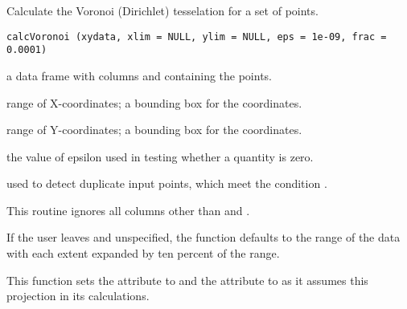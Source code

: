 \documentclass[letterpaper]{book}
\begin{document}
%
\begin{Examples}
\end{Examples}
%
\begin{Description}\relax
Calculate the Voronoi (Dirichlet) tesselation for a set of points.
\end{Description}
%
\begin{Usage}
\begin{verbatim}
calcVoronoi (xydata, xlim = NULL, ylim = NULL, eps = 1e-09, frac = 0.0001)
\end{verbatim}
\end{Usage}
%
\begin{Arguments}
\begin{ldescription}
\item[\code{xydata}] a data frame with columns  and 
containing the points.
\item[\code{xlim}] range of X-coordinates; a bounding box for the
coordinates.
\item[\code{ylim}] range of Y-coordinates; a bounding box for the
coordinates.
\item[\code{eps}] the value of epsilon used in testing whether a quantity is
zero.
\item[\code{frac}] used to detect duplicate input points, which meet the
condition .
\end{ldescription}
\end{Arguments}
%
\begin{Details}\relax
This routine ignores all columns other than  and .

If the user leaves  and  unspecified, the
function defaults to the range of the data with each extent expanded
by ten percent of the range.

This function sets the attribute  to  and the
attribute  to  as it assumes this projection in
its calculations.
\end{Details}
\end{document}
